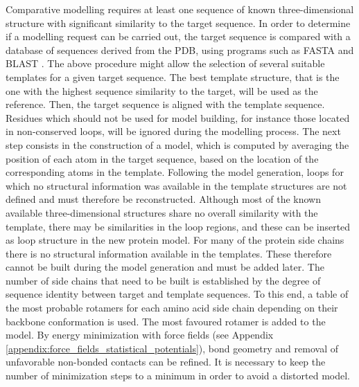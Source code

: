 Comparative modelling requires at least one sequence of known three-\-di\-men\-sio\-nal structure with significant similarity to the target sequence. In order to determine if a modelling request can be carried out, the target sequence is compared with a database of sequences derived from the PDB, using programs such as FASTA \cite{Pearson1988aa} and BLAST \cite{Altschul1990aa}. The above procedure might allow the selection of several suitable templates for a given target sequence. The best template structure, that is the one with the highest sequence similarity to the target, will be used as the reference. Then, the target sequence is aligned with the template sequence. Residues which should not be used for model building, for instance those located in non-conserved loops, will be ignored during the modelling process. The next step consists in the construction of a model, which is computed by averaging the position of each atom in the target sequence, based on the location of the corresponding atoms in the template. Following the model generation, loops for which no structural information was available in the template structures are not defined and must therefore be reconstructed. Although most of the known available three-\-di\-men\-sio\-nal structures share no overall similarity with the template, there may be similarities in the loop regions, and these can be inserted as loop structure in the new protein model. For many of the protein side chains there is no structural information available in the templates. These therefore cannot be built during the model generation and must be added later. The number of side chains that need to be built is established by the degree of sequence identity between target and template sequences. To this end, a table of the most probable rotamers for each amino acid side chain depending on their backbone conformation is used. The most favoured rotamer is added to the model. By energy minimization with force fields (see Appendix \ref{appendix:force_fields_statistical_potentials}), bond geometry and removal of unfavorable non-bonded contacts can be refined. It is necessary to keep the number of minimization steps to a minimum in order to avoid a distorted model.\\
